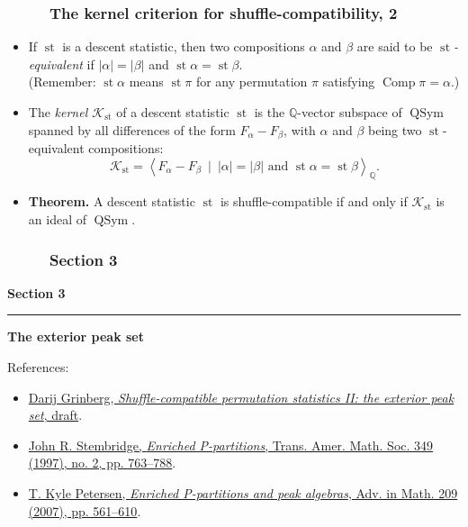 \documentclass{beamer}
\newcommand{\red}{\color{red}}
\newcommand{\QQ}{{\mathbb Q}}
\newcommand{\Comp}{\operatorname{Comp}}
\newcommand{\st}{\operatorname{st}}
\newcommand{\QSym}{\operatorname{QSym}}
\newcommand{\calK}{\mathcal{K}}
\newcommand{\fti}[1]{\frametitle{\ \ \ \ \ #1}}
\newcommand{\abs}[1]{\left| #1 \right|}
\newcommand{\defn}[1]{{\color{darkred}\emph{#1}}} %
\theoremstyle{plain}
\begin{document}
\begin{frame}
\fti{The kernel criterion for shuffle-compatibility, 2}

\begin{itemize}

\item If $\st$ is a descent statistic, then two compositions
      $\alpha$ and $\beta$ are said to be \defn{$\st$-equivalent}
      if $\abs{\alpha} = \abs{\beta}$ and $\st\alpha = \st\beta$.
      \\ (Remember: $\st\alpha$ means $\st\pi$ for any permutation
      $\pi$ satisfying $\Comp\pi = \alpha$.)

\pause

\item The \defn{kernel $\calK_{\st}$} of a descent statistic $\st$
      is the $\QQ$-vector subspace of $\QSym$ spanned by all
      differences of the form $F_\alpha - F_\beta$, with $\alpha$
      and $\beta$ being two $\st$-equivalent compositions:
      \[
      \calK_{\st} = \left< F_\alpha - F_\beta \ 
                              \mid \ \abs{\alpha} = \abs{\beta} \text{ and }
                                   \st \alpha = \st \beta \right>_\QQ .
      \]

\pause

\item \textbf{Theorem.} A descent statistic $\st$ is
      shuffle-compatible if and only if $\calK_{\st}$ is an
      ideal of $\QSym$.

\end{itemize}

\end{frame}

\begin{frame}
\fti{Section 3}
\begin{center}
{\LARGE \bf Section 3} \\
\noindent\rule[0.5ex]{\linewidth}{1pt}
{\Large \bf The exterior peak set}
\end{center}
\vspace{1cm}
References:
\begin{itemize}
\item \href{https://github.com/darijgr/gzshuf}{\red Darij Grinberg, \textit{Shuffle-compatible permutation statistics II: the exterior peak set}, draft}.
\item \href{http://www.ams.org/journals/tran/1997-349-02/S0002-9947-97-01804-7/}{\red John R. Stembridge, \textit{Enriched P-partitions}, Trans. Amer. Math. Soc. 349 (1997), no. 2, pp. 763--788}.
\item \href{https://doi.org/10.1016/j.aim.2006.05.0160}{\red T. Kyle Petersen, \textit{Enriched P-partitions and peak algebras}, Adv. in Math. 209 (2007), pp. 561--610}.
\end{itemize}
\end{frame}
\end{document}
